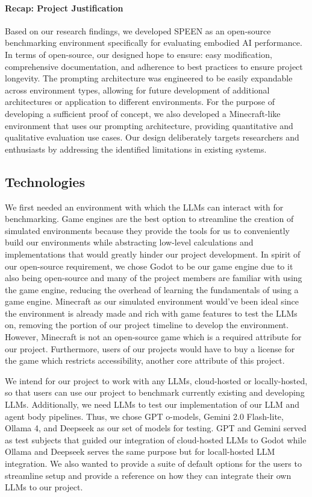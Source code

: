 \documentclass{article}
\begin{document}
\paragraph{Recap: Project Justification}
Based on our research findings, we developed SPEEN as an open-source benchmarking environment specifically for evaluating embodied AI performance.
In terms of open-source, our designed hope to ensure: easy modification, comprehensive documentation, and adherence to best practices to ensure project longevity.
The prompting architecture was engineered to be easily expandable across environment types, allowing for future development of additional architectures or application to different environments.
For the purpose of developing a sufficient proof of concept, we also developed a Minecraft-like environment that uses our prompting architecture, providing quantitative and qualitative evaluation use cases.
Our design deliberately targets researchers and enthusiasts by addressing the identified limitations in existing systems.

\subsection{Technologies}
We first needed an environment with which the LLMs can interact with for benchmarking.
Game engines are the best option to streamline the creation of simulated environments because they provide the tools for us to conveniently build our environments while abstracting low-level calculations and implementations that would greatly hinder our project development.
In spirit of our open-source requirement, we chose Godot to be our game engine due to it also being open-source and many of the project members are familiar with using the game engine, reducing the overhead of learning the fundamentals of using a game engine.
Minecraft as our simulated environment would've been ideal since the environment is already made and rich with game features to test the LLMs on, removing the portion of our project timeline to develop the environment.
However, Minecraft is not an open-source game which is a required attribute for our project. Furthermore, users of our projects would have to buy a license for the game which restricts accessibility, another core attribute of this project.

We intend for our project to work with any LLMs, cloud-hosted or locally-hosted, so that users can use our project to benchmark currently existing and developing LLMs.
Additionally, we need LLMs to test our implementation of our LLM and agent body pipelines.
Thus, we chose GPT o-models, Gemini 2.0 Flash-lite, Ollama 4, and Deepseek as our set of models for testing.
GPT and Gemini served as test subjects that guided our integration of cloud-hosted LLMs to Godot while Ollama and Deepseek serves the same purpose but for locall-hosted LLM integration.
We also wanted to provide a suite of default options for the users to streamline setup and provide a reference on how they can integrate their own LLMs to our project.
\end{document}
